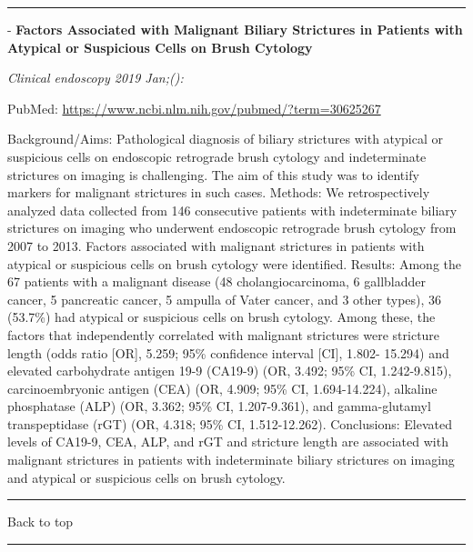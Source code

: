 \documentclass[]{article}
\begin{document}
\begin{center}\rule{0.5\linewidth}{\linethickness}\end{center}

 - \textbf{Factors Associated with Malignant Biliary Strictures in
Patients with Atypical or Suspicious Cells on Brush Cytology}

\emph{Clinical endoscopy 2019 Jan;():}

PubMed: \url{https://www.ncbi.nlm.nih.gov/pubmed/?term=30625267}

Background/Aims: Pathological diagnosis of biliary strictures with
atypical or suspicious cells on endoscopic retrograde brush cytology and
indeterminate strictures on imaging is challenging. The aim of this
study was to identify markers for malignant strictures in such cases.
Methods: We retrospectively analyzed data collected from 146 consecutive
patients with indeterminate biliary strictures on imaging who underwent
endoscopic retrograde brush cytology from 2007 to 2013. Factors
associated with malignant strictures in patients with atypical or
suspicious cells on brush cytology were identified. Results: Among the
67 patients with a malignant disease (48 cholangiocarcinoma, 6
gallbladder cancer, 5 pancreatic cancer, 5 ampulla of Vater cancer, and
3 other types), 36 (53.7\%) had atypical or suspicious cells on brush
cytology. Among these, the factors that independently correlated with
malignant strictures were stricture length (odds ratio {[}OR{]}, 5.259;
95\% confidence interval {[}CI{]}, 1.802- 15.294) and elevated
carbohydrate antigen 19-9 (CA19-9) (OR, 3.492; 95\% CI, 1.242-9.815),
carcinoembryonic antigen (CEA) (OR, 4.909; 95\% CI, 1.694-14.224),
alkaline phosphatase (ALP) (OR, 3.362; 95\% CI, 1.207-9.361), and
gamma-glutamyl transpeptidase (rGT) (OR, 4.318; 95\% CI, 1.512-12.262).
Conclusions: Elevated levels of CA19-9, CEA, ALP, and rGT and stricture
length are associated with malignant strictures in patients with
indeterminate biliary strictures on imaging and atypical or suspicious
cells on brush cytology.

{}

{}

\begin{center}\rule{0.5\linewidth}{\linethickness}\end{center}

Back to top

\begin{center}\rule{0.5\linewidth}{\linethickness}\end{center}
\end{document}
